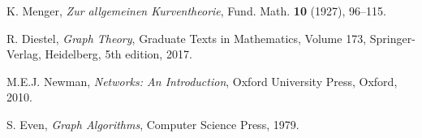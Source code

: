 \documentclass[12pt,a4paper,oneside]{report}
\begin{document}
\tableofcontents
\cleardoublepage
\makegloss
\newpage














\begin{thebibliography}{9}

K. Menger, 
\textit{Zur allgemeinen Kurventheorie},
Fund. Math. \textbf{10} (1927), 96--115.

R. Diestel, 
\textit{Graph Theory},
Graduate Texts in Mathematics, Volume 173, Springer-Verlag, Heidelberg, 5th edition, 2017.

M.E.J. Newman, 
\textit{Networks: An Introduction},
Oxford University Press, Oxford, 2010.

S. Even, 
\textit{Graph Algorithms},
Computer Science Press, 1979.

\end{thebibliography}
\end{document}
